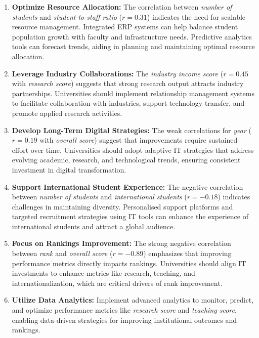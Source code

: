 \documentclass[sigconf]{acmart}
\begin{document}
\begin{enumerate}
	\item \textbf{Optimize Resource Allocation:} The correlation between \textit{number of students} and \textit{student-to-staff ratio} (\(r = 0.31\)) indicates the need for scalable resource management. Integrated ERP systems can help balance student population growth with faculty and infrastructure needs. Predictive analytics tools can forecast trends, aiding in planning and maintaining optimal resource allocation.
	
	\item \textbf{Leverage Industry Collaborations:} The \textit{industry income score} (\(r = 0.45\) with \textit{research score}) suggests that strong research output attracts industry partnerships. Universities should implement relationship management systems to facilitate collaboration with industries, support technology transfer, and promote applied research activities.
	
	\item \textbf{Develop Long-Term Digital Strategies:} The weak correlations for \textit{year} (\(r = 0.19\) with \textit{overall score}) suggest that improvements require sustained effort over time. Universities should adopt adaptive IT strategies that address evolving academic, research, and technological trends, ensuring consistent investment in digital transformation.
	
	\item \textbf{Support International Student Experience:} The negative correlation between \textit{number of students} and \textit{international students} (\(r = -0.18\)) indicates challenges in maintaining diversity. Personalised support platforms and targeted recruitment strategies using IT tools can enhance the experience of international students and attract a global audience.
	
	\item \textbf{Focus on Rankings Improvement:} The strong negative correlation between \textit{rank} and \textit{overall score} (\(r = -0.89\)) emphasizes that improving performance metrics directly impacts rankings. Universities should align IT investments to enhance metrics like research, teaching, and internationalization, which are critical drivers of rank improvement.
	
	\item \textbf{Utilize Data Analytics:} Implement advanced analytics to monitor, predict, and optimize performance metrics like \textit{research score} and \textit{teaching score}, enabling data-driven strategies for improving institutional outcomes and rankings.

\end{enumerate}
\end{document}
